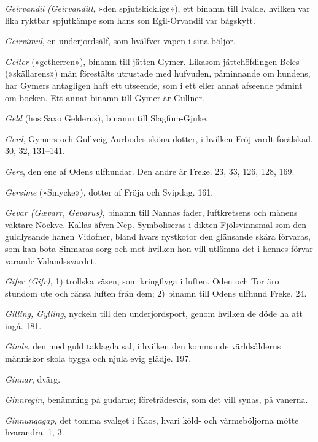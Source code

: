 \emph{Geirvandil (Geirvandill}, »den spjutskicklige»), ett binamn till
Ivalde, hvilken var lika ryktbar spjutkämpe som hans son Egil-Örvandil
var bågskytt.

\emph{Geirvimul}, en underjordsälf, som hvälfver vapen i sina böljor.

\emph{Geiter} (»getherren»), binamn till jätten Gymer. Likasom
jättehöfdingen\protect\hypertarget{lb1625905.xhtmlux5cux23start218}{}{}\protect\hypertarget{lb1625905.xhtmlux5cux23start218-a}{}{}\protect\hypertarget{lb1625905.xhtmlux5cux23start218-b}{}{}\protect\hypertarget{lb1625905.xhtmlux5cux23start218-c}{}{}\protect\hypertarget{lb1625905.xhtmlux5cux23start218-d}{}{}
Beles (»skällarens») män förestälts utrustade med hufvuden, påminnande
om hundens, har Gymers antagligen haft ett utseende, som i ett eller
annat afseende påmint om bocken. Ett annat binamn till Gymer är Gullner.

\emph{Geld} (hos Saxo Gelderus), binamn till Slagfinn-Gjuke.

\emph{Gerd}, Gymers och Gullveig-Aurbodes sköna dotter, i hvilken Fröj
vardt förälskad. 30, 32, 131--141.

\emph{Gere}, den ene af Odens ulfhundar. Den andre är Freke. 23, 33,
126, 128, 169.

\emph{Gersime} (»Smycke»), dotter af Fröja och Svipdag. 161.

\emph{Gevar (Gævarr, Gevarus)}, binamn till Nannas fader, luftkretsens
och månens väktare Nöckve. Kallas äfven Nep. Symboliseras i dikten
Fjölsvinnsmal som den guldlysande hanen Vidofner, bland hvars nystkotor
den glänsande skära förvaras, som kan bota Sinmaras sorg och mot hvilken
hon vill utlämna det i hennes förvar varande Valandssvärdet.

\emph{Gifer (Gifr)}, 1) trollska väsen, som kringflyga i luften. Oden
och Tor äro stundom ute och ränsa luften från dem; 2) binamn till Odens
ulfhund Freke. 24.

\emph{Gilling, Gylling}, nyckeln till den underjordsport, genom hvilken
de döde ha att ingå. 181.

\emph{Gimle}, den med guld taklagda sal, i hvilken den kommande
världsålderns människor skola bygga och njula evig glädje. 197.

\emph{Ginnar}, dvärg.

\emph{Ginnregin}, benämning på gudarne; företrädesvis, som det vill
synas, på vanerna.

\emph{Ginnungagap}, det tomma svalget i Kaos, hvari köld- och
värmeböljorna mötte hvarandra. 1, 3.

